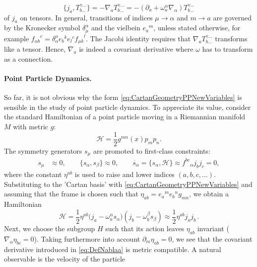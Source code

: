\documentclass[11pt,a4paper]{article}
\numberwithin{equation}{section}
\begin{document}
\begin{equation}
  \{ j_a , T_{b ...}^{\gamma ...} \} = - \nabla_a T_{b ...}^{\gamma ...} = - (\partial_a + \omega_a^\alpha \nabla_\alpha ) T_{b ...}^{\gamma ...} \label{eq:DefNablaa}
\end{equation}
of $j_a$ on tensors. In general, transitions of indices $\mu \rightarrow \alpha$ and $m \rightarrow a$ are governed by the Kronecker symbol $\delta_\mu^\alpha$ and the vielbein ${e_a}^m$, unless stated otherwise, for example ${f_{\alpha b}}^c = \delta_\alpha^\mu {e_b}^k {e_l}^c {f_{\mu k}}^l$. The Jacobi identity requires that $\nabla_a T_{b\dots}^{\gamma\dots}$ transforms like a tensor. Hence, $\nabla_a$ is indeed a covariant derivative where $\omega$ has to transform as a connection.

\paragraph{Point Particle Dynamics.} So far, it is not obvious why the form \eqref{eq:CartanGeometryPPNewVariables} is sensible in the study of point particle dynamics. To appreciate its value, consider the standard Hamiltonian of a point particle moving in a Riemannian manifold $M$ with metric $g$:
\begin{equation}
  \mathcal{H} = \frac{1}{2} g^{mn}(x) p_m p_n.
\end{equation}
The symmetry generators $s_\mu$ are promoted to first-class constraints:
\begin{align}
    s_\mu &\approx 0,  \qquad \{ s_\alpha , s_\beta \} \approx 0 , \qquad \dot{s_\alpha} = \{ s_\alpha , \mathcal{H} \} \approx {f^{bc}}_{\alpha} j_b j_c = 0 ,
\end{align}
where the constant $\eta^{ab}$ is used to raise and lower indices $(a,b,c,...)$. Substituting to the 'Cartan basis' with \eqref{eq:CartanGeometryPPNewVariables} and assuming that the frame is chosen such that $\eta_{ab} = {e_a}^m {e_b}^n g_{mn}$, we obtain a Hamiltonian
\begin{equation}
  \mathcal{H} = \frac{1}{2} \eta^{ab} \Big(j_a - \omega_a^\alpha s_\alpha \Big) \left( j_b - \omega_b^\beta s_\beta \right) \approx \frac{1}{2} \eta^{ab} j_a j_b\,.
\end{equation}
Next, we choose the subgroup $H$ such that its action leaves $\eta_{ab}$ invariant ($\nabla_\alpha \eta_{bc} = 0$). Taking furthermore into account $\partial_m \eta_{ab} = 0$, we see that the covariant derivative introduced in \eqref{eq:DefNablaa} is metric compatible. A natural observable is the velocity of the particle
\end{document}
